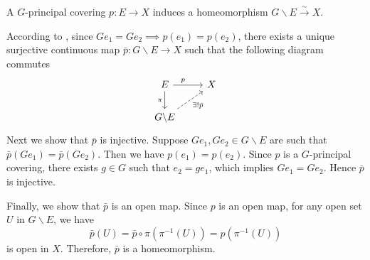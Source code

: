 \documentclass{report}
\begin{document}
\begin{proposition}{}{}
	A $G$-principal covering $p: E \rightarrow X$ induces a homeomorphism $G \backslash E \xrightarrow{\sim} X$.
\end{proposition}
\begin{prf}
	According to , since $Ge_1=Ge_2 \implies p(e_1)=p(e_2)$, there exists a unique surjective continuous map $\bar{p}: G\backslash E \to X$ such that the following diagram commutes
	\[
	\begin{tikzcd}
		E \arrow[r, "p\quad"] \arrow[d, "\pi"'] & X \\
		G\backslash E \arrow[ru, dashed, "\exists!\bar{p}"']
	\end{tikzcd}
	\]
	Next we show that $\bar{p}$ is injective. Suppose $Ge_1,Ge_2\in G\backslash E$ are such that $\bar{p}(Ge_1)=\bar{p}(G e_2)$. Then we have $p(e_1)=p(e_2)$. Since $p$ is a $G$-principal covering, there exists $g\in G$ such that $e_2=ge_1$, which implies $Ge_1=Ge_2$. Hence $\bar{p}$ is injective. 

	Finally, we show that $\bar{p}$ is an open map. Since $p$ is an open map, for any open set $U$ in $G\backslash E$, we have 
	\[ 
		\bar{p}(U)=\bar{p}\circ \pi\left(\pi^{-1}(U)\right)=p\left(\pi^{-1}(U)\right)
	\]
	is open in $X$. Therefore, $\bar{p}$ is a homeomorphism.
\end{prf}
\end{document}
